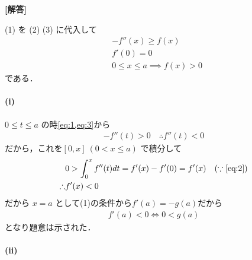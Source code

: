 \documentclass[../../main.tex]{subfiles}
\begin{document}
\begin{oframed}
  
\end{oframed}

{\bf [解答]}

(1) を (2) (3) に代入して
\begin{align}
  & -f''(x) \ge f(x) \label{eq:1} \\
  & f'(0) = 0  \label{eq:2} \\
  & 0 \le x \le a \implies f(x) > 0  \label{eq:3}
\end{align}
である．

\paragraph{(i)}

$0 \le t \le a$ の時\cref{eq:1,eq:3}から
\begin{align}
  -f''(t) > 0 \quad\therefore f''(t) < 0
\end{align}
だから，これを$[0, x]\ (0 < x \le a)$ で積分して
\begin{align}
  & 0 > \int_{0}^{x}f''(t)dt = f'(x) - f'(0) =  f'(x)  \quad (\because \text{\cref{eq:2}}) \\
  \therefore
  & f'(x) < 0  \label{eq:4}
\end{align}
だから $x = a$ として(1)の条件から$f'(a)=-g(a)$だから
\begin{align}
  f'(a) < 0 \iff 0 < g(a)
\end{align}
となり題意は示された．

\paragraph{(ii)}
\end{document}
